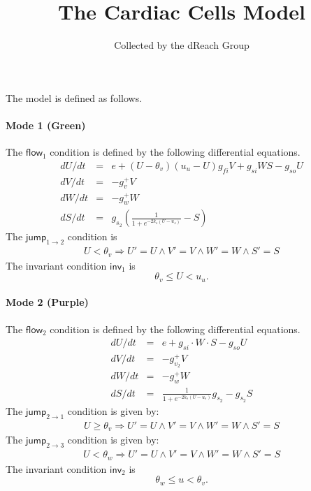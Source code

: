 \documentclass{article}
\title{The Cardiac Cells Model}
\author{Collected by the dReach Group}
\newcommand{\flow}{\mathsf{flow}}
\newcommand{\jump}{\mathsf{jump}}
\newcommand{\inv}{\mathsf{inv}}
\begin{document}
\maketitle

The model is defined as follows. 

\paragraph{Mode 1 (Green)}
The $\flow_1$ condition is defined by the following differential equations.
\begin{eqnarray*}
dU/dt &=& e  + ( U - \theta_v)(u_u - U)g_{fi}V + g_{si}WS-g_{so}U\\
dV/dt &=& -g_v^+ V\\
dW/dt &=& -g_w^+ W\\
dS/dt &=& g_{s_2} (\frac{1}{1+e^{-2k_s(U-u_s)}}- S)
\end{eqnarray*}
The $\jump_{1\rightarrow 2}$ condition is
\begin{eqnarray*}
U < \theta_v \Longrightarrow U' = U \wedge V' = V \wedge W' = W \wedge S' =
S
\end{eqnarray*}
The invariant condition $\inv_1$ is
$$\theta_v \leq U < u_u.$$

\paragraph{Mode 2 (Purple)}
The $\flow_2$ condition is defined by the following differential equations.
\begin{eqnarray*}
dU/dt &=& e  + g_{si}\cdot W\cdot S -g_{so}U\\
dV/dt &=& -g_{v_2}^+ V\\
dW/dt &=& -g_w^+ W\\
dS/dt &=& \frac{1}{1+e^{-2k_s(U-u_s)}}g_{s_2} - g_{s_2}S
\end{eqnarray*}
The $\jump_{2\rightarrow 1}$ condition is given by:
\begin{eqnarray*}
U \geq \theta_v \Longrightarrow U' = U \wedge V' = V \wedge W' = W \wedge S'
= S
\end{eqnarray*}
The $\jump_{2\rightarrow 3}$ condition is given by:
\begin{eqnarray*}
U < \theta_w \Longrightarrow U' = U \wedge V' = V \wedge W' = W \wedge S'
= S
\end{eqnarray*}
The invariant condition $\inv_2$ is
$$\theta_w\leq u< \theta_v.$$
\end{document}
